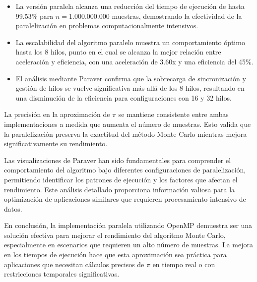 \documentclass[a4paper, 10pt, onecolumn]{IEEEtran}
\begin{document}
\begin{itemize}
  \item La versión paralela alcanza una reducción del tiempo de ejecución de hasta 99.53\% para $n = 1.000.000.000$ muestras, demostrando la efectividad de la paralelización en problemas computacionalmente intensivos.
  
  \item La escalabilidad del algoritmo paralelo muestra un comportamiento óptimo hasta los 8 hilos, punto en el cual se alcanza la mejor relación entre aceleración y eficiencia, con una aceleración de 3.60x y una eficiencia del 45\%.
  
  \item El análisis mediante Paraver confirma que la sobrecarga de sincronización y gestión de hilos se vuelve significativa más allá de los 8 hilos, resultando en una disminución de la eficiencia para configuraciones con 16 y 32 hilos.
\end{itemize}

La precisión en la aproximación de $\pi$ se mantiene consistente entre ambas implementaciones a medida que aumenta el número de muestras. Esto valida que la paralelización preserva la exactitud del método Monte Carlo mientras mejora significativamente su rendimiento.

Las visualizaciones de Paraver han sido fundamentales para comprender el comportamiento del algoritmo bajo diferentes configuraciones de paralelización, permitiendo identificar los patrones de ejecución y los factores que afectan el rendimiento. Este análisis detallado proporciona información valiosa para la optimización de aplicaciones similares que requieren procesamiento intensivo de datos.

En conclusión, la implementación paralela utilizando OpenMP demuestra ser una solución efectiva para mejorar el rendimiento del algoritmo Monte Carlo, especialmente en escenarios que requieren un alto número de muestras. La mejora en los tiempos de ejecución hace que esta aproximación sea práctica para aplicaciones que necesitan cálculos precisos de $\pi$ en tiempo real o con restricciones temporales significativas.
\end{document}
